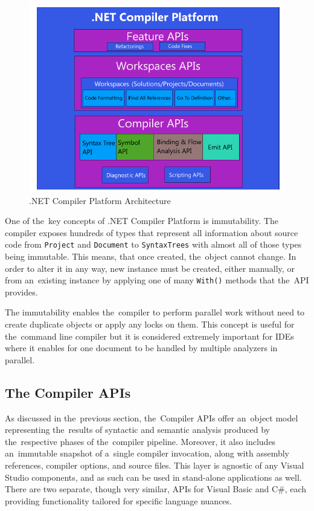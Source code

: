 \documentclass[
  digital, %
  table,   %
  lof,     %
  lot,     %
  oneside,
]{fithesis3}
\begin{document}
\begin{figure}[h!]
		\centering
			\includegraphics[scale=0.6]{img/roslyn-compiler-architecture}
		\caption{.NET Compiler Platform Architecture~\cite{roslyn-succincly}}
		\label{fig:roslyn-compiler-architecture}
\end{figure}

One of the~key concepts of .NET Compiler Platform is immutability. The compiler exposes hundreds of types that represent all information about source code from \texttt{Project} and \texttt{Document} to \texttt{SyntaxTrees} with almost all of those types being immutable. This means, that once created, the~object cannot change. In order to alter it in any way, new instance must be created, either manually, or from an~existing instance by applying one of many \texttt{With()} methods that the~API provides.

The immutability enables the~compiler to perform parallel work without need to create duplicate objects or apply any locks on them. This concept is useful for the~command line compiler but it is considered extremely important for IDEs where it enables for one document to be handled by multiple analyzers in parallel.

\subsection{The Compiler APIs}
As discussed in the~previous section, the~Compiler APIs offer an~object model representing the~results of syntactic and semantic analysis produced by the~respective phases of the~compiler pipeline. Moreover, it also includes an~immutable snapshot of a~single compiler invocation, along with assembly references, compiler options, and source files. This layer is agnostic of any Visual Studio components, and as such can be used in stand-alone applications as well. There are two separate, though very similar, APIs for Visual Basic and C\#, each providing functionality tailored for specific language nuances.
\end{document}

